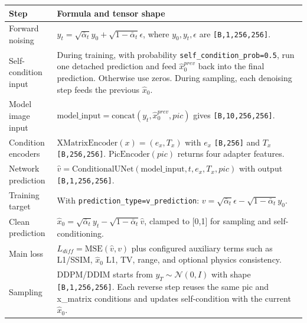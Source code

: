 \documentclass[10pt,landscape]{article}
\newcommand{\shape}[1]{\texttt{[#1]}}
\begin{document}
\small
\begin{tabular}{>{\raggedright\arraybackslash}p{58mm} >{\raggedright\arraybackslash}p{338mm}}
\toprule
Step & Formula and tensor shape \\
\midrule
Forward noising & $y_t=\sqrt{\bar{\alpha}_t}y_0+\sqrt{1-\bar{\alpha}_t}\epsilon$, where $y_0,y_t,\epsilon$ are \shape{B,1,256,256}. \\
Self-condition input & During training, with probability \texttt{self\_condition\_prob=0.5}, run one detached prediction and feed $\hat{x}_0^{prev}$ back into the final prediction. Otherwise use zeros. During sampling, each denoising step feeds the previous $\hat{x}_0$. \\
Model image input & $\mathrm{model\_input}=\mathrm{concat}(y_t,\hat{x}_0^{prev},pic)$ gives \shape{B,10,256,256}. \\
Condition encoders & $\mathrm{XMatrixEncoder}(x)=(e_x,T_x)$ with $e_x$ \shape{B,256} and $T_x$ \shape{B,256,256}. $\mathrm{PicEncoder}(pic)$ returns four adapter features. \\
Network prediction & $\hat{v}=\mathrm{ConditionalUNet}(\mathrm{model\_input},t,e_x,T_x,pic)$ with output \shape{B,1,256,256}. \\
Training target & With \texttt{prediction\_type=v\_prediction}: $v=\sqrt{\bar{\alpha}_t}\epsilon-\sqrt{1-\bar{\alpha}_t}y_0$. \\
Clean prediction & $\hat{x}_0=\sqrt{\bar{\alpha}_t}y_t-\sqrt{1-\bar{\alpha}_t}\hat{v}$, clamped to [0,1] for sampling and self-conditioning. \\
Main loss & $L_{diff}=\mathrm{MSE}(\hat{v},v)$ plus configured auxiliary terms such as L1/SSIM, $\hat{x}_0$ L1, TV, range, and optional physics consistency. \\
Sampling & DDPM/DDIM starts from $y_T\sim\mathcal{N}(0,I)$ with shape \shape{B,1,256,256}. Each reverse step reuses the same pic and x\_matrix conditions and updates self-condition with the current $\hat{x}_0$. \\
\bottomrule
\end{tabular}
\normalsize

\vspace{7mm}
\end{document}
